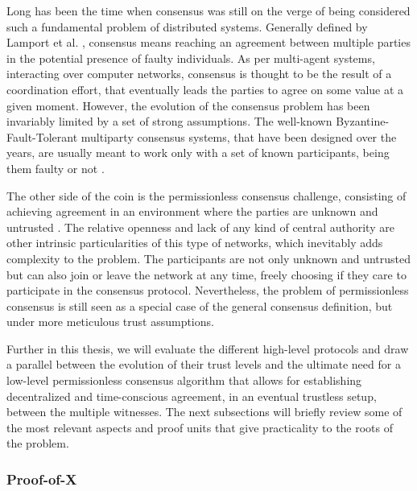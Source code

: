 
Long has been the time when consensus was still on the verge of being considered such a fundamental problem of distributed systems. Generally defined by Lamport et al. \cite{pease1980reaching, lamport2019byzantine}, consensus means reaching an agreement between multiple parties in the potential presence of faulty individuals. As per multi-agent systems, interacting over computer networks, consensus is thought to be the result of a coordination effort, that eventually leads the parties to agree on some value at a given moment. However, the evolution of the consensus problem has been invariably limited by a set of strong assumptions. The well-known Byzantine-Fault-Tolerant multiparty consensus systems, that have been designed over the years, are usually meant to work only with a set of known participants, being them faulty or not \cite{castro1999practical}. 

The other side of the coin is the permissionless consensus challenge, consisting of achieving agreement in an environment where the parties are unknown and untrusted \cite{nakamoto2008bitcoin, buterin2014next}. The relative openness and lack of any kind of central authority are other intrinsic particularities of this type of networks, which inevitably adds complexity to the problem. The participants are not only unknown and untrusted but can also join or leave the network at any time, freely choosing if they care to participate in the consensus protocol. Nevertheless, the problem of permissionless consensus is still seen as a special case of the general consensus definition, but under more meticulous trust assumptions.

Further in this thesis, we will evaluate the different high-level \pol{} protocols and draw a parallel between the evolution of their trust levels and the ultimate need for a low-level permissionless consensus algorithm that allows for establishing decentralized and time-conscious agreement, in an eventual trustless setup, between the multiple witnesses. The next subsections will briefly review some of the most relevant aspects and proof units that give practicality to the roots of the problem.

\subsubsection{Proof-of-X}

